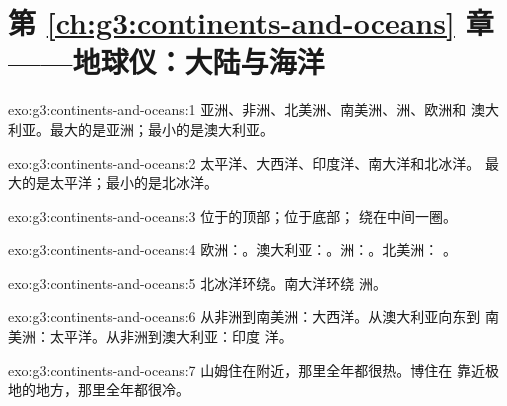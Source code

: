 \section*{第 \ref{ch:g3:continents-and-oceans} 章——地球仪：大陆与海洋}

\begin{solution}{exo:g3:continents-and-oceans:1}
亚洲、非洲、北美洲、南美洲、洲、欧洲和
澳大利亚。最大的是亚洲；最小的是澳大利亚。
\end{solution}

\begin{solution}{exo:g3:continents-and-oceans:2}
太平洋、大西洋、印度洋、南大洋和北冰洋。
最大的是太平洋；最小的是北冰洋。
\end{solution}

\begin{solution}{exo:g3:continents-and-oceans:3}
位于的顶部；位于底部；
绕在中间一圈。
\end{solution}

\begin{solution}{exo:g3:continents-and-oceans:4}
欧洲：。澳大利亚：。洲：。北美洲：
。
\end{solution}

\begin{solution}{exo:g3:continents-and-oceans:5}
北冰洋环绕。南大洋环绕
洲。
\end{solution}

\begin{solution}{exo:g3:continents-and-oceans:6}
从非洲到南美洲：大西洋。从澳大利亚向东到
南美洲：太平洋。从非洲到澳大利亚：印度
洋。
\end{solution}

\begin{solution}{exo:g3:continents-and-oceans:7}
山姆住在附近，那里全年都很热。博住在
靠近极地的地方，那里全年都很冷。
\end{solution}

